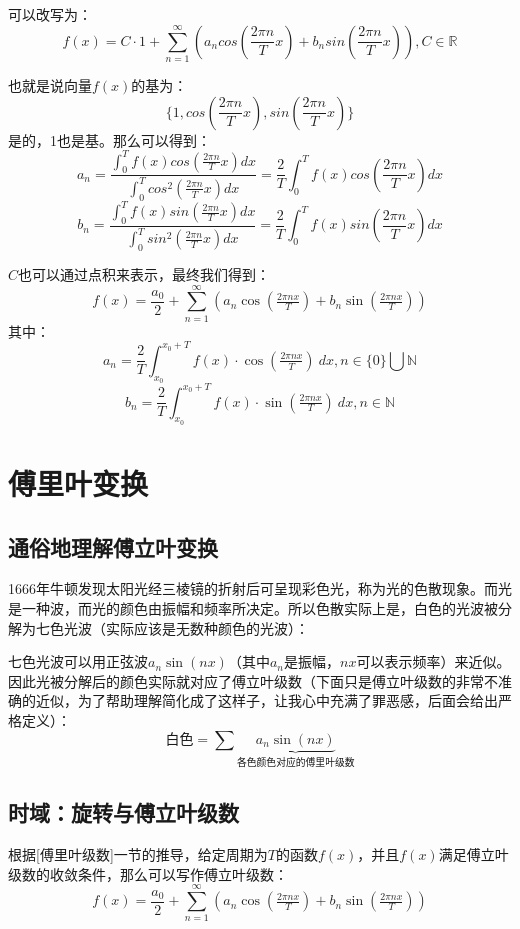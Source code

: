 \documentclass[12pt]{article}
\begin{document}
可以改写为：
$$
f(x)=C\cdot 1+\sum _{{n=1}}^{\infty}\left(a_{n}cos({\frac{2\pi n}{T}x})+b_{n}sin({\frac{2\pi n}{T}x})\right),C\in\mathbb{R}
$$

也就是说向量$f(x)$的基为：
$$
\{1,cos({\frac{2\pi n}{T}x}),sin({\frac{2\pi n}{T}x})\}
$$
是的，1也是基。那么可以得到：
$$
a_n=\frac{\int_{0}^{T}f(x)cos({\frac{2\pi n}{T}x})dx}{\int_{0}^{T}cos^2({\frac{2\pi n}{T}x})dx}=\frac{2}{T}\int_{0}^{T}f(x)cos({\frac{2\pi n}{T}x})dx
$$
$$
b_n=\frac{\int_{0}^{T}f(x)sin({\frac{2\pi n}{T}x})dx}{\int_{0}^{T}sin^2({\frac{2\pi n}{T}x})dx}=\frac{2}{T}\int_{0}^{T}f(x)sin({\frac{2\pi n}{T}x})dx
$$

$C$也可以通过点积来表示，最终我们得到：
$$
f(x)={\frac{a_{0}}{2}}+\sum _{{n=1}}^{\infty}\left(a_{n}\cos({\tfrac  {2\pi nx}{T}})+b_{n}\sin({\tfrac  {2\pi nx}{T}})\right)
$$
其中：
$$
a_{n}={\frac  {2}{T}}\int _{{x_{0}}}^{{x_{0}+T}}f(x)\cdot \cos({\tfrac  {2\pi nx}{T}})\ dx, n\in\{0\}\bigcup\mathbb{N}
$$
$$
b_{n}={\frac  {2}{T}}\int _{{x_{0}}}^{{x_{0}+T}}f(x)\cdot \sin({\tfrac  {2\pi nx}{T}})\ dx, n\in\mathbb{N}
$$

\section{傅里叶变换\cite{Understand_Fourier_Transform_Ma}}
\subsection{通俗地理解傅立叶变换}
1666年牛顿发现太阳光经三棱镜的折射后可呈现彩色光，称为光的色散现象。而光是一种波，而光的颜色由振幅和频率所决定。所以色散实际上是，白色的光波被分解为七色光波（实际应该是无数种颜色的光波）：

七色光波可以用正弦波$a_n\sin(nx)$（其中$a_n$是振幅，$nx$可以表示频率）来近似。因此光被分解后的颜色实际就对应了傅立叶级数（下面只是傅立叶级数的非常不准确的近似，为了帮助理解简化成了这样子，让我心中充满了罪恶感，后面会给出严格定义）：
$$
\text{白色} = \sum\underbrace{{a_n}\sin(nx)}_{\text{各色颜色对应的傅里叶级数}}
$$

\subsection{时域：旋转与傅立叶级数}
根据[傅里叶级数]一节的推导，给定周期为$T$的函数$f(x)$，并且$f(x)$满足傅立叶级数的收敛条件，那么可以写作傅立叶级数：
$$
f(x)={\frac{a_{0}}{2}}+\sum _{{n=1}}^{\infty}\left(a_{n}\cos({\tfrac  {2\pi nx}{T}})+b_{n}\sin({\tfrac  {2\pi nx}{T}})\right)
$$
\end{document}
